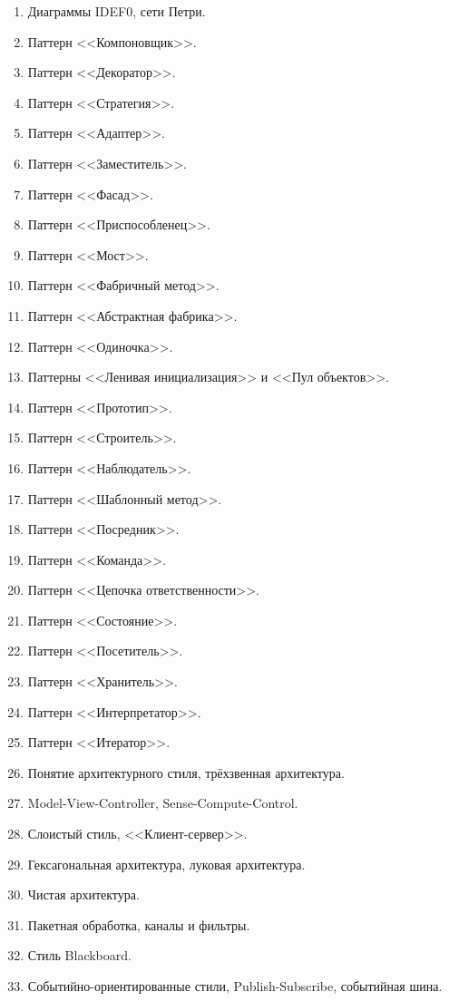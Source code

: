 \documentclass[a5paper]{article}
\begin{document}
\begin{enumerate}
    \item Диаграммы IDEF0, сети Петри. 
    \item Паттерн <<Компоновщик>>.
    \item Паттерн <<Декоратор>>.
    \item Паттерн <<Стратегия>>.
    \item Паттерн <<Адаптер>>.
    \item Паттерн <<Заместитель>>.
    \item Паттерн <<Фасад>>.
    \item Паттерн <<Приспособленец>>.
    \item Паттерн <<Мост>>.
    \item Паттерн <<Фабричный метод>>.
    \item Паттерн <<Абстрактная фабрика>>.
    \item Паттерн <<Одиночка>>.
    \item Паттерны <<Ленивая инициализация>> и <<Пул объектов>>.
    \item Паттерн <<Прототип>>.
    \item Паттерн <<Строитель>>.
    \item Паттерн <<Наблюдатель>>.
    \item Паттерн <<Шаблонный метод>>.
    \item Паттерн <<Посредник>>.
    \item Паттерн <<Команда>>.
    \item Паттерн <<Цепочка ответственности>>.
    \item Паттерн <<Состояние>>.
    \item Паттерн <<Посетитель>>.
    \item Паттерн <<Хранитель>>.
    \item Паттерн <<Интерпретатор>>.
    \item Паттерн <<Итератор>>.
    \item Понятие архитектурного стиля, трёхзвенная архитектура.
    \item Model-View-Controller, Sense-Compute-Control.
    \item Слоистый стиль, <<Клиент-сервер>>.
    \item Гексагональная архитектура, луковая архитектура.
    \item Чистая архитектура.
    \item Пакетная обработка, каналы и фильтры. 
    \item Стиль Blackboard.
    \item Событийно-ориентированные стили, Publish-Subscribe, событийная шина.

\end{enumerate}
\end{document}
